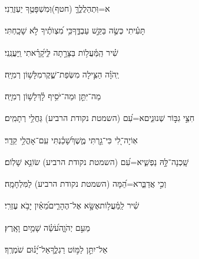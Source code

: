 \documentclass[12pt]{article}
\newcommand{\loc}[1]{\textsuperscript{\locf{#1}}}
\begin{document}
{\loc{ קעה}~}‏ א=וּֽתְהַלֲלֶ֑ךָּ (חטף){\hfill}וּֽמִשְׁפָּטֶ֥ךָ יַעְזְרֻֽנִי׃\par

{\loc{ קעו}~}‏תָּעִ֗יתִי כְּשֶׂ֣ה  בַּקֵּ֣שׁ עַבְדֶּ֑ךָ{\hfill}כִּ֥י מִ֝צְוֺתֶ֗יךָ לֹ֣א שָׁכָֽחְתִּי׃\par\pend
\ledpb
\pstart[\subsection*{\textcolor{red}{פרק קכ}}]\label{פרק קכ}
{\loc{ א}~}‏שִׁ֗יר הַֽמַּ֫עֲל֥וֹת\newline\hspace*{.5em} בַּצָּרָ֣תָה לִּ֑י{\hfill}קָ֝רָ֗אתִי וַֽיַּעֲנֵֽנִי׃\par

{\loc{ ב}~}‏יְֽהֹוָ֗ה הַצִּ֣ילָה  מִשְּׂפַת־שֶׁ֑קֶר{\hfill}מִלָּשׁ֥וֹן רְמִיָּֽה׃\par

{\loc{ ג}~}‏מַה־יִּתֵּ֣ן  וּמַה־יֹּסִ֥יף לָ֗ךְ{\hfill}לָשׁ֥וֹן רְמִיָּֽה׃\par

{\loc{ ד}~}‏חִצֵּ֣י גִבּ֣וֹר שְׁנוּנִ֑ים{\hfill}א=עִ֝ם (השמטת נקודת הרביע) גַּחֲלֵ֥י רְתָמִֽים׃\par

{\loc{ ה}~}‏אֽוֹיָה־לִ֭י כִּי־גַ֣רְתִּי מֶ֑שֶׁךְ{\hfill}שָׁ֝כַ֗נְתִּי עִֽם־אָהֳלֵ֥י קֵדָֽר׃\par

{\loc{ ו}~}‏ שָֽׁכְנָה־לָּ֣הּ נַפְשִׁ֑י{\hfill}א=עִ֝ם (השמטת נקודת הרביע) שׂוֹנֵ֥א שָׁלֽוֹם׃\par

{\loc{ ז}~}‏ וְכִ֣י אֲדַבֵּ֑ר{\hfill}א=הֵ֝מָּה (השמטת נקודת הרביע) לַמִּלְחָמָֽה׃\par\pend

\pstart[\subsection*{\textcolor{red}{פרק קכא}}]\label{פרק קכא}
{\loc{ א}~}‏שִׁ֗יר לַֽמַּ֫עֲל֥וֹת\newline\hspace*{.5em}אֶשָּׂ֣א  אֶל־הֶהָרִ֑ים{\hfill}מֵ֝אַ֗יִן יָבֹ֥א עֶזְרִֽי׃\par

{\loc{ ב}~}‏ מֵעִ֣ם יְהֹוָ֑ה{\hfill}עֹ֝שֵׂ֗ה שָׁמַ֥יִם וָאָֽרֶץ׃\par

{\loc{ ג}~}‏אַל־יִתֵּ֣ן לַמּ֣וֹט רַגְלֶ֑ךָ{\hfill}אַל־יָ֝נ֗וּם שֹׁמְרֶֽךָ׃\par
\end{document}
